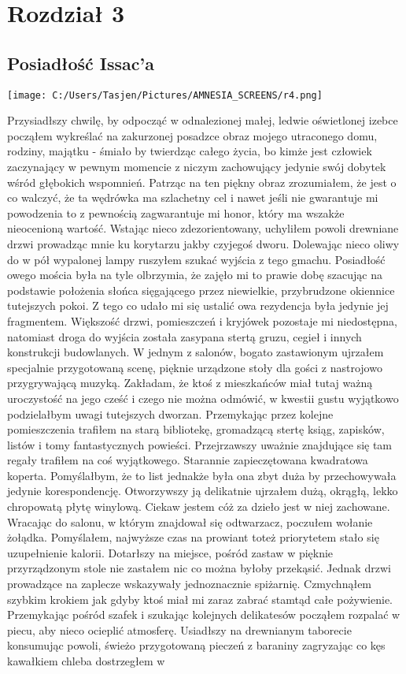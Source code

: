 \documentclass[12pt,a4paper]{report}
\begin{document}
\section{\textbf{Rozdział 3}}
\subsection{Posiadłość Issac'a} 
\begin{center}
\texttt{[image: C:/Users/Tasjen/Pictures/AMNESIA\_SCREENS/r4.png]} \\
\end{center}

Przysiadłszy chwilę, by odpocząć w odnalezionej małej, ledwie oświetlonej izebce począłem wykreślać na zakurzonej posadzce obraz mojego utraconego domu, rodziny, majątku - śmiało by twierdząc całego życia, bo kimże jest człowiek zaczynający w pewnym momencie z niczym zachowujący jedynie swój dobytek wśród głębokich wspomnień. Patrząc na ten piękny obraz zrozumiałem, że jest o co walczyć, że ta wędrówka ma szlachetny cel i nawet jeśli nie gwarantuje mi powodzenia to z pewnością zagwarantuje mi honor, który ma wszakże nieocenioną wartość. Wstając nieco zdezorientowany, uchyliłem powoli drewniane drzwi prowadząc mnie ku korytarzu jakby czyjegoś dworu. Dolewając nieco oliwy do w pół wypalonej lampy ruszyłem szukać wyjścia z tego gmachu. Posiadłość owego mościa była na tyle olbrzymia, że zajęło mi to prawie dobę szacując na podstawie położenia słońca sięgającego przez niewielkie, przybrudzone okiennice tutejszych pokoi. Z tego co udało mi się ustalić owa rezydencja była jedynie jej fragmentem. Większość drzwi, pomieszczeń i kryjówek pozostaje mi niedostępna, natomiast droga do wyjścia została zasypana stertą gruzu, cegieł i innych konstrukcji budowlanych. W jednym z salonów, bogato zastawionym ujrzałem specjalnie przygotowaną scenę, pięknie urządzone stoły dla gości z nastrojowo przygrywającą muzyką. Zakładam, że ktoś z mieszkańców miał tutaj ważną uroczystość na jego cześć i czego nie można odmówić, w kwestii gustu wyjątkowo podzielałbym uwagi tutejszych dworzan. Przemykając przez kolejne pomieszczenia trafiłem na starą bibliotekę, gromadzącą stertę ksiąg, zapisków, listów i tomy fantastycznych powieści. Przejrzawszy uważnie znajdujące się tam regały trafiłem na coś wyjątkowego. Starannie zapieczętowana kwadratowa koperta. Pomyślałbym, że to list jednakże była ona zbyt duża by przechowywała jedynie korespondencję. Otworzywszy ją delikatnie ujrzałem dużą, okrągłą, lekko chropowatą płytę winylową. Ciekaw jestem cóż za dzieło jest w niej zachowane. Wracając do salonu, w którym znajdował się odtwarzacz, poczułem wołanie żołądka. Pomyślałem, najwyższe czas na prowiant toteż priorytetem stało się uzupełnienie kalorii. Dotarłszy na miejsce, pośród zastaw w pięknie przyrządzonym stole nie zastałem nic co można byłoby przekąsić. Jednak drzwi prowadzące na zaplecze wskazywały jednoznacznie spiżarnię. Czmychnąłem szybkim krokiem jak gdyby ktoś miał mi zaraz zabrać stamtąd całe pożywienie. Przemykając pośród szafek i szukając kolejnych delikatesów począłem rozpalać w piecu, aby nieco ocieplić atmosferę. Usiadłszy na drewnianym taborecie konsumując powoli, świeżo przygotowaną pieczeń z baraniny zagryzając co kęs kawałkiem chleba dostrzegłem w 
\end{document}
